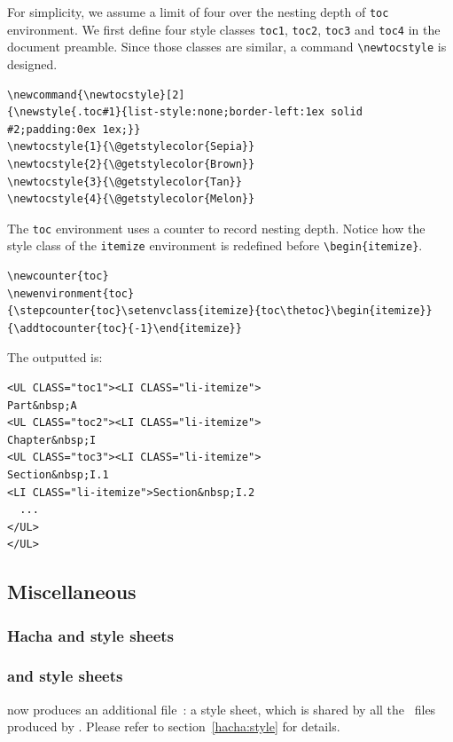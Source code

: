 For simplicity, we assume a limit of four over the nesting depth of
\texttt{toc} environment.
We first define four style classes \texttt{toc1}, \texttt{toc2},
\texttt{toc3} and \texttt{toc4} in the document preamble.
Since those classes are similar, a command \verb+\newtocstyle+ is
designed.
\begin{verbatim}
\newcommand{\newtocstyle}[2]
{\newstyle{.toc#1}{list-style:none;border-left:1ex solid #2;padding:0ex 1ex;}}
\newtocstyle{1}{\@getstylecolor{Sepia}}
\newtocstyle{2}{\@getstylecolor{Brown}}
\newtocstyle{3}{\@getstylecolor{Tan}}
\newtocstyle{4}{\@getstylecolor{Melon}}
\end{verbatim}
The \texttt{toc} environment uses a counter to record nesting depth.
Notice how the style class of the \texttt{itemize} environment is
redefined before \verb+\begin{itemize}+.
\begin{verbatim}
\newcounter{toc}
\newenvironment{toc}
{\stepcounter{toc}\setenvclass{itemize}{toc\thetoc}\begin{itemize}}
{\addtocounter{toc}{-1}\end{itemize}}
\end{verbatim}
The outputted {\html} is:
\begin{verbatim}
<UL CLASS="toc1"><LI CLASS="li-itemize">
Part&nbsp;A
<UL CLASS="toc2"><LI CLASS="li-itemize">
Chapter&nbsp;I
<UL CLASS="toc3"><LI CLASS="li-itemize">
Section&nbsp;I.1
<LI CLASS="li-itemize">Section&nbsp;I.2
  ...
</UL>
</UL>
\end{verbatim}

\subsection{Miscellaneous}
\ifpdf
\subsubsection{Hacha and style sheets}
\else
\subsubsection{\hacha{} and style sheets}
\fi
\hacha{} now produces an additional file~: a style sheet, which is
shared by all the~{\html} files produced by \hacha.
Please refer to section~\ref{hacha:style} for details.

